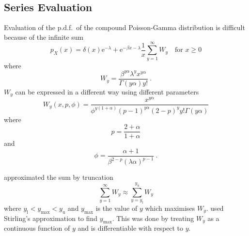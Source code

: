 \documentclass[12pt, a4paper]{memoir}
\newcommand{\euler}{\mathrm{e}}
\begin{document}
\subsection{Series Evaluation}
Evaluation of the p.d.f.~of the compound Poisson-Gamma distribution is difficult because of the infinite sum
\begin{equation}
p_X(x) = 
	\delta(x) \euler^{-\lambda}
	+
	\euler^{-\beta x-\lambda}\frac{1}{x}\sum_{y=1}^{\infty}W_y
	\quad\text{for }x\geqslant 0
\end{equation}
where
\begin{equation}
	W_y = \frac{\beta^{y\alpha}\lambda^yx^{y\alpha}}{\Gamma(y\alpha)y!}
	\ .
	\label{eq:compoundPoisson_Wy}
\end{equation}
$W_y$ can be expressed in a different way using different parameters
\begin{equation}
	W_y(x,p,\phi)=\frac{x^{y\alpha}}{\phi^{y(1+\alpha)}(p-1)^{y\alpha}(2-p)^yy!\Gamma(y\alpha)}
\end{equation}
where
\begin{equation}
	p=\frac{2+\alpha}{1+\alpha}
\end{equation}
and
\begin{equation}
	\phi = \frac{\alpha+1}{\beta^{2-p}(\lambda\alpha)^{p-1}} \ .
\end{equation}

\cite{dunn2005series} approximated the sum by truncation
\begin{equation}
	\sum_{y=1}^\infty W_y \approx \sum_{y=y_\text{l}}^{y_\text{u}}W_y
\end{equation}
where $y_\text{l}<y_{\text{max}}<y_\text{u}$ and $y_{\text{max}}$ is the value of $y$ which maximises $W_y$. \cite{dunn2005series} used Stirling's approximation to find $y_{\text{max}}$. This was done by treating $W_y$ as a continuous function of $y$ and is differentiable with respect to $y$.
\end{document}
